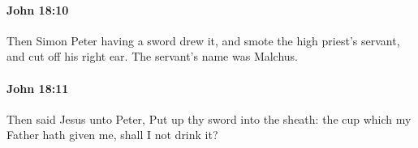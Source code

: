 		\paragraph{John 18:10} %
			\label{JOHN-18-10}

			Then Simon Peter having a sword drew it, and smote the high priest's servant, and cut off his right ear. The servant's name was Malchus.

			\begin{framed}
				\scriptsize
				\begin{compactdesc}
					\item[SBLG] 
				\end{compactdesc}
			\end{framed}

		\paragraph{John 18:11} %
			\label{JOHN-18-11}

			Then said Jesus unto Peter, Put up thy sword into the sheath: the cup which my Father hath given me, shall I not drink it?

